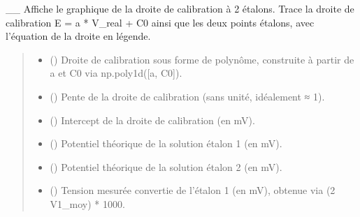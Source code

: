 \documentclass[letterpaper,10pt,english]{sphinxmanual}
\begin{document}
\begin{fulllineitems}
\label{\detokenize{calibration:calibration.graphe_cal2}}
\pysigstartsignatures
\pysiglinewithargsret
{}
{\sphinxparamcomma {}\sphinxparamcomma {}\sphinxparamcomma {}\sphinxparamcomma {}\sphinxparamcomma {}\sphinxparamcomma {}}
{}
\pysigstopsignatures
\sphinxAtStartPar
\_\_
Affiche le graphique de la droite de calibration à 2 étalons.
Trace la droite de calibration E = a * V\_real + C0 ainsi que les deux points
étalons, avec l’équation de la droite en légende.
\begin{quote}\begin{description}
\begin{itemize}
\item {} 
\sphinxAtStartPar
{} () \textendash{} Droite de calibration sous forme de polynôme,
construite à partir de a et C0 via np.poly1d({[}a, C0{]}).

\item {} 
\sphinxAtStartPar
{} () \textendash{} Pente de la droite de calibration (sans unité, idéalement ≈ 1).

\item {} 
\sphinxAtStartPar
{} () \textendash{} Intercept de la droite de calibration (en mV).

\item {} 
\sphinxAtStartPar
{} () \textendash{} Potentiel théorique de la solution étalon 1 (en mV).

\item {} 
\sphinxAtStartPar
{} () \textendash{} Potentiel théorique de la solution étalon 2 (en mV).

\item {} 
\sphinxAtStartPar
{} () \textendash{} Tension mesurée convertie de l’étalon 1 (en mV),
obtenue via (2 \sphinxhyphen{} V1\_moy) * 1000.


\end{itemize}
\end{description}
\end{quote}
\end{fulllineitems}
\end{document}
